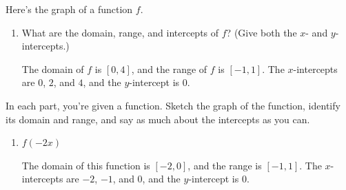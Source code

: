 \documentclass{article}
\begin{document}
\begin{enumerate}
  Here's the graph of a function $f$. 


  \begin{enumerate}
  \item
    \begin{problem}[0.5in]
      What are the domain, range, and intercepts of $f$? (Give both the $x$- and $y$-intercepts.)
    \end{problem}

    \begin{solution}
      The domain of $f$ is $[0, 4]$, and the range of $f$ is $[-1, 1]$. The $x$-intercepts are
      $0$, $2$, and $4$, and the $y$-intercept is $0$. 
    \end{solution}

  \end{enumerate}
  In each part, you're given a function. Sketch the graph of the function, identify its domain and range, and say as much about the intercepts as you can.
    \begin{enumerate}[resume]
    \item
      \begin{problem}[1.5in]
        $f(-2x)$
      \end{problem}

      \begin{solution}
          The domain of this function is $[-2,0]$, and the range is $[-1,1]$. The
          $x$-intercepts are $-2$, $-1$, and $0$, and the $y$-intercept is $0$. 

      \end{solution}


\end{enumerate}
\end{enumerate}
\end{document}
